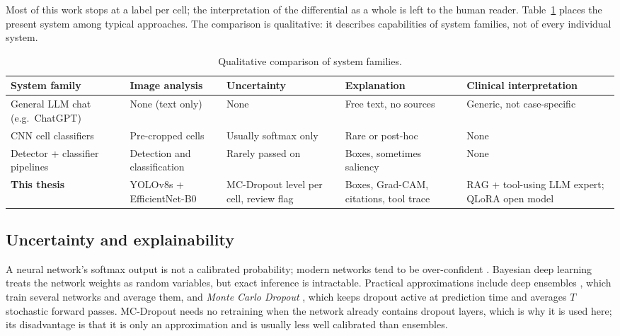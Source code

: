 Most of this work stops at a label per cell; the interpretation of the differential as a whole is left to the human reader. Table~\ref{tab:related} places the present system among typical approaches. The comparison is qualitative: it describes capabilities of system families, not of every individual system.

\begin{table}[H]
\centering
\caption{Qualitative comparison of system families.}
\label{tab:related}
\footnotesize
\begin{tabularx}{\textwidth}{>{\raggedright\arraybackslash}p{2.6cm} X X X X}
\toprule
\textbf{System family} & \textbf{Image analysis} & \textbf{Uncertainty} & \textbf{Explanation} & \textbf{Clinical interpretation} \\
\midrule
General LLM chat (e.g.\ ChatGPT) & None (text only) & None & Free text, no sources & Generic, not case-specific \\
CNN cell classifiers & Pre-cropped cells & Usually softmax only & Rare or post-hoc & None \\
Detector + classifier pipelines & Detection and classification & Rarely passed on & Boxes, sometimes saliency & None \\
\textbf{This thesis} & YOLOv8s + EfficientNet-B0 & MC-Dropout level per cell, review flag & Boxes, Grad-CAM, citations, tool trace & RAG + tool-using LLM expert; QLoRA open model \\
\bottomrule
\end{tabularx}
\end{table}

\subsection{Uncertainty and explainability}

A neural network's softmax output is not a calibrated probability; modern networks tend to be over-confident \cite{guo2017}. Bayesian deep learning treats the network weights as random variables, but exact inference is intractable. Practical approximations include deep ensembles \cite{lakshminarayanan2017}, which train several networks and average them, and \emph{Monte Carlo Dropout} \cite{gal2016}, which keeps dropout active at prediction time and averages $T$ stochastic forward passes. MC-Dropout needs no retraining when the network already contains dropout layers, which is why it is used here; its disadvantage is that it is only an approximation and is usually less well calibrated than ensembles.

